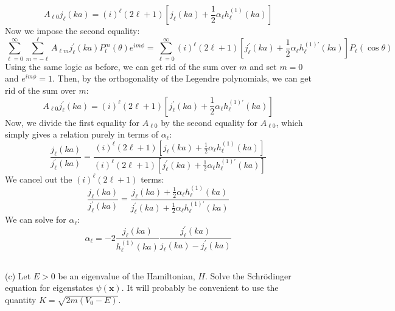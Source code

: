 \documentclass[12pt]{article}
\begin{document}
\begin{equation}
A_{\ell 0} j_{\ell}(k a)= (i)^{\ell}(2 \ell+1)\left[j_{\ell}(k a)+\frac{1}{2} \alpha_{\ell} h_{\ell}^{(1)}(k a)\right]
\end{equation}
Now we impose the second equality:
\begin{equation}
\sum_{\ell=0}^{\infty} \sum_{m=-\ell}^{\ell}A_{\ell m} j_{\ell}^{\prime}(k a) P_l^m(\theta) e^{i m \phi}= \sum_{\ell=0}^{\infty}(i)^{\ell}(2 \ell+1)\left[j_{\ell}^{\prime}(k a)+\frac{1}{2} \alpha_{\ell} h_{\ell}^{(1) \prime}(k a)\right] P_{\ell}(\cos \theta)
\end{equation}
Using the same logic as before, we can get rid of the sum over $m$ and set $m=0$ and $e^{i m \phi}=1$. Then, by the orthogonality of the Legendre polynomials, we can get rid of the sum over $m$:
\begin{equation}
A_{\ell 0} j_{\ell}^{\prime}(k a)= (i)^{\ell}(2 \ell+1)\left[j_{\ell}^{\prime}(k a)+\frac{1}{2} \alpha_{\ell} h_{\ell}^{(1) \prime}(k a)\right]
\end{equation}
Now, we divide the first equality for $A_{\ell 0}$ by the second equality for $A_{\ell 0}$, which simply gives a relation purely in terms of $\alpha_{\ell}$:
\begin{equation}
\frac{j_{\ell}(k a)}{j_{\ell}^{\prime}(k a)}= \frac{(i)^{\ell}(2 \ell+1)\left[j_{\ell}(k a)+\frac{1}{2} \alpha_{\ell} h_{\ell}^{(1)}(k a)\right]}{(i)^{\ell}(2 \ell+1)\left[j_{\ell}^{\prime}(k a)+\frac{1}{2} \alpha_{\ell} h_{\ell}^{(1) \prime}(k a)\right]}
\end{equation}
We cancel out the $(i)^{\ell}(2 \ell+1)$ terms:
\begin{equation}
\frac{j_{\ell}(k a)}{j_{\ell}^{\prime}(k a)}= \frac{j_{\ell}(k a)+\frac{1}{2} \alpha_{\ell} h_{\ell}^{(1)}(k a)}{j_{\ell}^{\prime}(k a)+\frac{1}{2} \alpha_{\ell} h_{\ell}^{(1) \prime}(k a)}
\end{equation}
We can solve for $\alpha_{\ell}$:
\begin{equation}
\alpha_{\ell}=-2 \frac{j_{\ell}(k a)}{h_{\ell}^{(1)}(k a)} \frac{j_{\ell}^{\prime}(k a)}{j_{\ell}(k a)-j_{\ell}^{\prime}(k a)}
\end{equation}
\subsection{}
(c) Let $E>0$ be an eigenvalue of the Hamiltonian, $H$. Solve the Schrödinger equation for eigenstates $\psi(\mathbf{x})$. It will probably be convenient to use the quantity $K=\sqrt{2 m\left(V_{0}-E\right)}$.
\end{document}
